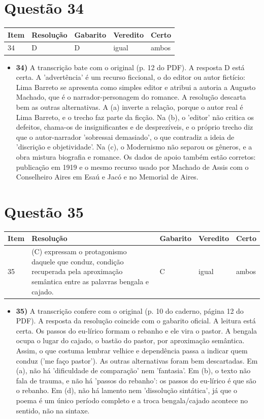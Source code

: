 \documentclass{article}%
\begin{document}
\section*{Questão 34}%
\begin{longtable}{@{}p{} p{} p{} p{} p{}@{}}\toprule Item & Resolução & Gabarito & Veredito & Certo \\ \midrule
34 & D & D & igual & ambos \\
\bottomrule\end{longtable}%
\begin{itemize}%
\item%
\textbf{34)} A transcrição bate com o original (p. 12 do PDF). A resposta D está certa. A 'advertência' é um recurso ficcional, o do editor ou autor fictício: Lima Barreto se apresenta como simples editor e atribui a autoria a Augusto Machado, que é o narrador{-}personagem do romance. A resolução descarta bem as outras alternativas. A (a) inverte a relação, porque o autor real é Lima Barreto, e o trecho faz parte da ficção. Na (b), o 'editor' não critica os defeitos, chama{-}os de insignificantes e de desprezíveis, e o próprio trecho diz que o autor{-}narrador 'sobressai demasiado', o que contradiz a ideia de 'discrição e objetividade'. Na (c), o Modernismo não separou os gêneros, e a obra mistura biografia e romance. Os dados de apoio também estão corretos: publicação em 1919 e o mesmo recurso usado por Machado de Assis com o Conselheiro Aires em Esaú e Jacó e no Memorial de Aires.%
\end{itemize}%
\section*{Questão 35}%
\begin{longtable}{@{}p{} p{} p{} p{} p{}@{}}\toprule Item & Resolução & Gabarito & Veredito & Certo \\ \midrule
35 & (C) expressam o protagonismo daquele que conduz, condição recuperada pela aproximação semântica entre as palavras bengala e cajado. & C & igual & ambos \\
\bottomrule\end{longtable}%
\begin{itemize}%
\item%
\textbf{35)} A transcrição confere com o original (p. 10 do caderno, página 12 do PDF). A resposta da resolução coincide com o gabarito oficial. A leitura está certa. Os passos do eu{-}lírico formam o rebanho e ele vira o pastor. A bengala ocupa o lugar do cajado, o bastão do pastor, por aproximação semântica. Assim, o que costuma lembrar velhice e dependência passa a indicar quem conduz ('me faço pastor'). As outras alternativas foram bem descartadas. Em (a), não há 'dificuldade de comparação' nem 'fantasia'. Em (b), o texto não fala de trauma, e não há 'passos do rebanho': os passos do eu{-}lírico é que são o rebanho. Em (d), não há lamento nem 'dissolução sintática', já que o poema é um único período completo e a troca bengala/cajado acontece no sentido, não na sintaxe.%
\end{itemize}%
\end{document}
